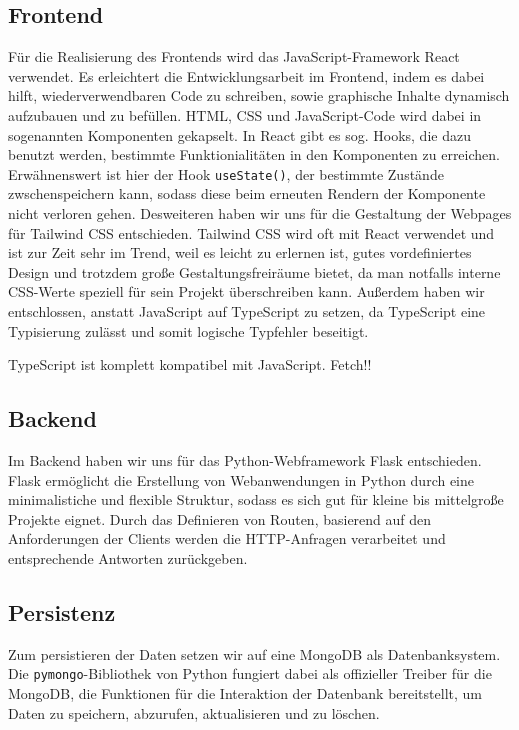 \documentclass[conference,a4paper,flushend]{cs-techrep}
\begin{document}
\subsection{Frontend}
Für die Realisierung des Frontends wird das JavaScript-Framework React verwendet. Es erleichtert die Entwicklungsarbeit im Frontend, indem es dabei hilft, wiederverwendbaren Code zu schreiben, sowie graphische Inhalte dynamisch aufzubauen und zu befüllen. HTML, CSS und JavaScript-Code wird dabei in sogenannten Komponenten gekapselt. In React gibt es sog. Hooks, die dazu benutzt werden, bestimmte Funktionialitäten in den Komponenten zu erreichen. Erwähnenswert ist hier der Hook \texttt{useState()}, der bestimmte Zustände zwschenspeichern kann, sodass diese beim erneuten Rendern der Komponente nicht verloren gehen. Desweiteren haben wir uns für die Gestaltung der Webpages für Tailwind CSS entschieden. Tailwind CSS wird oft mit React verwendet und ist zur Zeit sehr im Trend, weil es leicht zu erlernen ist, gutes vordefiniertes Design und trotzdem große Gestaltungsfreiräume bietet, da man notfalls interne CSS-Werte speziell für sein Projekt überschreiben kann. Außerdem haben wir entschlossen, anstatt JavaScript auf TypeScript zu setzen, da TypeScript eine Typisierung zulässt und somit logische Typfehler beseitigt. 

TypeScript ist komplett kompatibel mit JavaScript.
Fetch!!


\subsection{Backend}
Im Backend haben wir uns für das Python-Webframework Flask entschieden. Flask ermöglicht die Erstellung von Webanwendungen in Python durch eine minimalistiche und flexible Struktur, sodass es sich gut für kleine bis mittelgroße Projekte eignet. Durch das Definieren von Routen, basierend auf den Anforderungen der Clients werden die HTTP-Anfragen verarbeitet und entsprechende Antworten zurückgeben. 

\subsection{Persistenz}
Zum persistieren der Daten setzen wir auf eine MongoDB als Datenbanksystem. Die \texttt{pymongo}-Bibliothek von Python fungiert dabei als offizieller Treiber für die MongoDB, die Funktionen für die Interaktion der Datenbank bereitstellt, um Daten zu speichern, abzurufen, aktualisieren und zu löschen.
\end{document}
